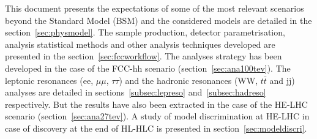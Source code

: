 This document presents the expectations of some of the most relevant scenarios beyond the Standard Model (BSM) and the considered models are detailed in the section~\ref{sec:physmodel}.
The sample production, detector parametrisation, analysis statistical methods and other analysis techniques developed are presented in the section~\ref{sec:fccworkflow}.
The analyses strategy has been developed in the case of the FCC-hh scenario (section~\ref{sec:ana100tev}).
The leptonic resonances (ee, $\mu\mu$, $\tau\tau$) and the hadronic resonances (WW, $t\bar{t}$ and jj) analyses are detailed in sections~\ref{subsec:lepreso} and~\ref{subsec:hadreso} respectively.
But the results have also been extracted in the case of the HE-LHC scenario (section~\ref{sec:ana27tev}).
A study of model discrimination at HE-LHC in case of discovery at the end of HL-HLC is presented in section~\ref{sec:modeldiscri}.
